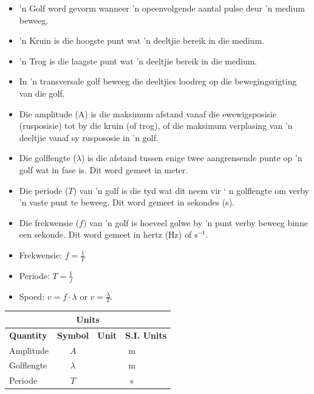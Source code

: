 \begin{definition}
            \nopagebreak
      \label{m38806*id324089}\begin{itemize}[noitemsep] 
            \label{m38806*uid108}\item  'n Golf word gevorm wanneer  'n opeenvolgende aantal pulse deur  'n medium beweeg.
\label{m38806*uid109}\item   'n Kruin is die hoogste punt wat   'n deeltjie bereik in die medium.
\label{m38806*uid110}\item  'n Trog is die laagste punt wat   'n deeltjie bereik in die medium.
\label{m38806*uid111}\item In  'n transversale golf beweeg die deeltjies loodreg op die bewegingsrigting van die golf.
\label{m38806*uid112}\item Die amplitude (A) is die maksimum afstand vanaf die ewewigsposisie (rusposisie) tot by die kruin 
       (of trog), of die maksimum verplasing van  'n deeltjie vanaf sy ruspososie in  'n golf.
\label{m38806*uid113}\item Die golflengte ($\lambda $) is die afstand tussen enige twee aangrensende punte op  'n golf wat in
         fase is. Dit word gemeet in meter.
\label{m38806*uid114}\item Die periode ($T$) van  'n golf is die tyd wat dit neem vir  ‘ n golflengte om verby   'n vaste punt te beweeg.
       Dit word gemeet in sekondes (s).
\label{m38806*uid115}\item Die frekwensie ($f$) van  'n golf is hoeveel golwe by  'n punt verby beweeg binne een sekonde. Dit word
       gemeet in hertz (Hz) of $\text{s}{}^{-1}$.
\label{m38806*uid116}\item Frekwensie: $f=\frac{1}{T}$\label{m38806*uid117}\item Periode: $T=\frac{1}{f}$\label{m38806*uid118}\item Spoed: $v=f\cdot\lambda $ or $v=\frac{\lambda }{T}$.
\end{itemize}
\begin{table}[H]
\begin{center}
\begin{tabular}{|l|c|c|c|}\hline \hline 
\multicolumn{4}{|c|}{\textbf{Units}}\\ \hline \hline
\textbf{Quantity} & \textbf{Symbol} & \textbf{Unit} & \textbf{S.I. Units}\\ \hline
Amplitude & $A$ & \multicolumn{2}{c|}{m} \\ \hline
Golflengte & $\lambda$ & \multicolumn{2}{c|}{m}  \\ \hline
Periode & $T$ & \multicolumn{2}{c|}{s}  \\ \hline

\end{tabular}
\end{center}
\end{table}
\end{definition}
